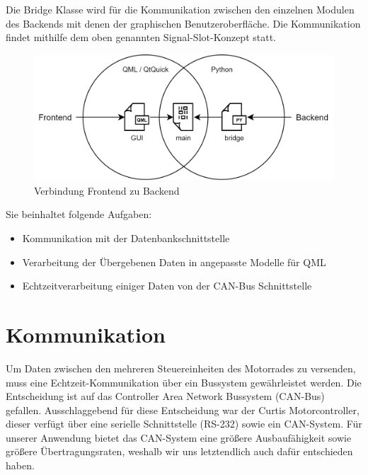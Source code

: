 Die Bridge Klasse wird für die Kommunikation zwischen den einzelnen Modulen des Backends mit denen der graphischen Benutzeroberfläche. Die Kommunikation findet mithilfe dem oben genannten Signal-Slot-Konzept statt.

\begin{figure}[H]
	\begin{center}
		\includegraphics[scale=0.33]{figures/hcis/bridge.png}
		\caption{Verbindung Frontend zu Backend}
	\end{center}
\end{figure}

Sie beinhaltet folgende Aufgaben:

\begin{itemize}
	\item Kommunikation mit der Datenbankschnittstelle
	\item Verarbeitung der Übergebenen Daten in angepasste Modelle für QML
	\item Echtzeitverarbeitung einiger Daten von der CAN-Bus Schnittstelle
\end{itemize}

\newpage


\section{Kommunikation}

Um Daten zwischen den mehreren Steuereinheiten des Motorrades zu versenden, muss eine Echtzeit-Kommunikation über ein Bussystem gewährleistet werden. Die Entscheidung ist auf das Controller Area Network Bussystem (CAN-Bus) gefallen. Ausschlaggebend für diese Entscheidung war der Curtis Motorcontroller, dieser verfügt über eine serielle Schnittstelle (RS-232) sowie ein CAN-System. Für unserer Anwendung bietet das CAN-System eine größere Ausbaufähigkeit sowie größere Übertragungsraten, weshalb wir uns letztendlich auch dafür entschieden haben.

